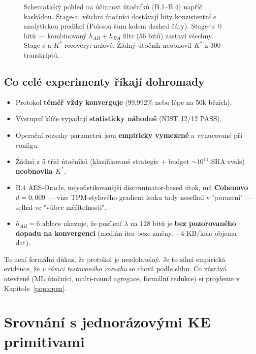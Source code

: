 \documentclass[11pt,a4paper]{article}
\begin{document}
\begin{figure}[h]
\caption{Schematický pohled na účinnost útočníků (B.1--B.4) napříč kaskádou. Stage-a: všichni útočníci dostávají hity konzistentní s analytickou predikcí (Poisson šum kolem dashed čáry). Stage-b: 0 hitů --- kombinovaný $h_{AB} + h_{BA}$ filtr (56 bitů) zastaví všechny. Stage-c a $K^*$ recovery: nulové. Žádný útočník neobnovil $K^*$ z 300 transkriptů.}
\label{fig:attacker-effectiveness}
\end{figure}

\subsection{Co celé experimenty říkají dohromady}

\begin{tldr}
\begin{itemize}[leftmargin=*]
\item Protokol \textbf{téměř vždy konverguje} (99{,}992\% nebo lépe na 50k bězích).
\item Výstupní klíče vypadají \textbf{statisticky náhodně} (NIST 12/12 PASS).
\item Operační rozsahy parametrů jsou \textbf{empiricky vymezené} a vynucované při configu.
\item Žádná z 5 tříd útočníků (klasifikované strategie + budget $\sim 10^{11}$ SHA evals) \textbf{neobnovila $K^*$}.
\item B.4 AES-Oracle, nejsofistikovanější discriminator-based útok, má \textbf{Cohenovo $d = 0{,}009$} --- vize TPM-stylového gradient leaku tady neselhal v "porazení" --- selhal ve "vůbec měřitelnosti".
\item $h_{AB}=6$ ablace ukazuje, že posílení $\lambda$ na 128 bitů je \textbf{bez pozorovaného dopadu na konvergenci} (medián iter beze změny, +4 KB/kolo objemu dat).
\end{itemize}
\end{tldr}

To není formální důkaz, že protokol je nezdolatelný. Je to silná empirická evidence, že \emph{v rámci testovaného rozsahu} se chová podle slibu. Co zůstává otevřené (ML útočníci, multi-round agregace, formální redukce) si projdeme v Kapitole~\ref{pop:open}.

\section{Srovnání s jednorázovými KE primitivami}\label{pop:comparison}
\end{document}
